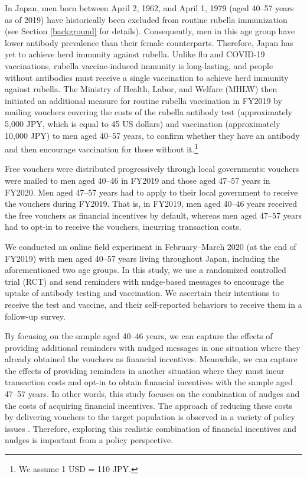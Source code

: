 \documentclass[
]{article}
\begin{document}
In Japan, men born between April 2, 1962, and April 1, 1979 (aged 40--57 years as of 2019) have historically been excluded from routine rubella immunization (see Section \ref{background} for details). Consequently, men in this age group have lower antibody prevalence than their female counterparts. Therefore, Japan has yet to achieve herd immunity against rubella. Unlike flu and COVID-19 vaccinations, rubella vaccine-induced immunity is long-lasting, and people without antibodies must receive a single vaccination to achieve herd immunity against rubella. The Ministry of Health, Labor, and Welfare (MHLW) then initiated an additional measure for routine rubella vaccination in FY2019 by mailing vouchers covering the costs of the rubella antibody test (approximately 5,000 JPY, which is equal to 45 US dollars) and vaccination (approximately 10,000 JPY) to men aged 40--57 years, to confirm whether they have an antibody and then encourage vaccination for those without it.\footnote{We assume 1 USD = 110 JPY.}

Free vouchers were distributed progressively through local governments: vouchers were mailed to men aged 40--46 in FY2019 and those aged 47--57 years in FY2020. Men aged 47--57 years had to apply to their local government to receive the vouchers during FY2019. That is, in FY2019, men aged 40--46 years received the free vouchers as financial incentives by default, whereas men aged 47--57 years had to opt-in to receive the vouchers, incurring transaction costs.

We conducted an online field experiment in February--March 2020 (at the end of FY2019) with men aged 40--57 years living throughout Japan, including the aforementioned two age groups. In this study, we use a randomized controlled trial (RCT) and send reminders with nudge-based messages to encourage the uptake of antibody testing and vaccination. We ascertain their intentions to receive the test and vaccine, and their self-reported behaviors to receive them in a follow-up survey.

By focusing on the sample aged 40--46 years, we can capture the effects of providing additional reminders with nudged messages in one situation where they already obtained the vouchers as financial incentives. Meanwhile, we can capture the effects of providing reminders in another situation where they must incur transaction costs and opt-in to obtain financial incentives with the sample aged 47--57 years. In other words, this study focuses on the combination of nudges and the costs of acquiring financial incentives. The approach of reducing these costs by delivering vouchers to the target population is observed in a variety of policy issues \citep[e.g.,][]{Ahmed2011, Kacker2022}. Therefore, exploring this realistic combination of financial incentives and nudges is important from a policy perspective.
\end{document}
